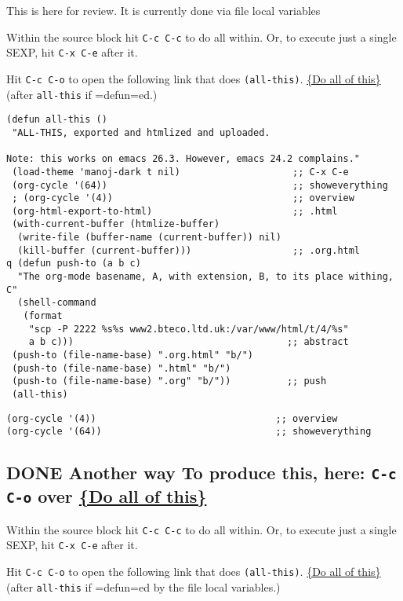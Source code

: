 \documentclass[11pt]{article}
\begin{document}
This is here for review. It is currently done via file local variables

Within the source block hit \texttt{C-c C-c} to do all within.
Or, to execute just a single SEXP, hit \texttt{C-x C-e} after it.

Hit \texttt{C-c C-o} to open the following link that does \texttt{(all-this)}.
\href{(all-this)}{\{Do all of this\}} (after \texttt{all-this} if =defun=ed.)

\begin{verbatim}
(defun all-this ()
 "ALL-THIS, exported and htmlized and uploaded.

Note: this works on emacs 26.3. However, emacs 24.2 complains."
 (load-theme 'manoj-dark t nil)                    ;; C-x C-e
 (org-cycle '(64))                                 ;; showeverything
 ; (org-cycle '(4))                                ;; overview
 (org-html-export-to-html)                         ;; .html
 (with-current-buffer (htmlize-buffer) 
  (write-file (buffer-name (current-buffer)) nil)
  (kill-buffer (current-buffer)))                  ;; .org.html
q (defun push-to (a b c)
  "The org-mode basename, A, with extension, B, to its place withing, C"
  (shell-command
   (format
    "scp -P 2222 %s%s www2.bteco.ltd.uk:/var/www/html/t/4/%s"
    a b c)))                                      ;; abstract
 (push-to (file-name-base) ".org.html" "b/")
 (push-to (file-name-base) ".html" "b/")
 (push-to (file-name-base) ".org" "b/"))          ;; push
 (all-this)
\end{verbatim}

\begin{verbatim}
(org-cycle '(4))                                ;; overview
(org-cycle '(64))                               ;; showeverything
\end{verbatim}

\subsection*{{\bfseries\sffamily DONE} Another way To produce this, here: \texttt{C-c C-o} over \href{(all-this)}{\{Do all of this\}}}
\label{sec:orgdbf0d3e}

Within the source block hit \texttt{C-c C-c} to do all within.
Or, to execute just a single SEXP, hit \texttt{C-x C-e} after it.

Hit \texttt{C-c C-o} to open the following link that does \texttt{(all-this)}.
\href{(all-this)}{\{Do all of this\}} (after \texttt{all-this} if =defun=ed by the file local variables.)
\end{document}
